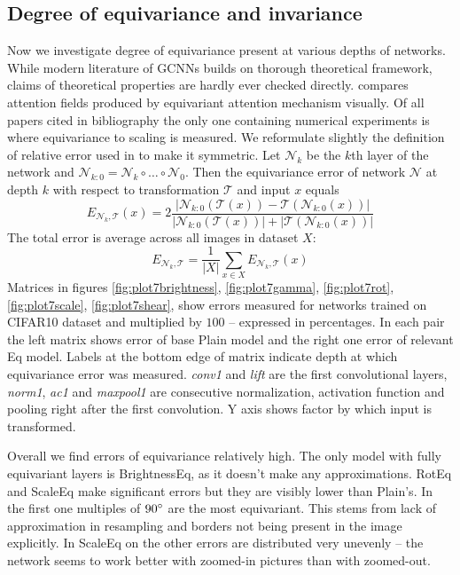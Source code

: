 \subsection{Degree of equivariance and invariance}
    \label{sec:exp_eq}
    \newcommand{\mcn}{\mathcal{N}}
    \newcommand{\mct}{\mathcal{T}}
    Now we investigate degree of equivariance present at
    various depths of networks. While modern literature of GCNNs builds on
    thorough theoretical framework, claims of theoretical properties are hardly
    ever checked directly. \cite{attentive_gcnn} compares attention fields
    produced by equivariant attention mechanism visually.
    Of all papers cited in bibliography the only one containing numerical
    experiments is
    \cite{scale_steerable} where equivariance to scaling is measured.
    We reformulate slightly the definition of relative error used in
    \cite{scale_steerable} to make it symmetric.
    Let $\mcn_k$ be the $k$th layer of
    the network and $\mcn_{k:0} = \mcn_k \circ \dots \circ \mcn_0$. Then the
    equivariance error of network $\mcn$
    at depth $k$ with respect to transformation $\mathcal{T}$
    and input $x$ equals
    $$ E_{\mcn_k,\mct}(x) = 2\frac{\left|\mcn_{k:0}\left(\mct(x)\right) -
    \mct(\mcn_{k:0}(x))\right|}
    {\left|\mcn_{k:0}(\mct(x))\right| + \left|\mct(\mcn_{k:0}(x))\right|} $$
    The total error is average across all images in dataset $X$:
    $$ E_{\mcn_k,\mct} = \frac{1}{|X|}\sum_{x \in X }E_{\mcn_k,\mct}(x) $$
    Matrices in figures
    \ref{fig:plot7brightness},
    \ref{fig:plot7gamma},
    \ref{fig:plot7rot},
    \ref{fig:plot7scale},
    \ref{fig:plot7shear},
    show errors measured for networks trained on CIFAR10 dataset and multiplied
    by $100$ -- expressed in percentages.
    In each pair the left matrix shows error of base Plain model and the right one
    error of relevant Eq model. Labels at the bottom edge of
    matrix indicate depth at which equivariance error was measured.
    \textit{conv1} and \textit{lift} are the first convolutional layers,
    \textit{norm1}, \textit{ac1} and \textit{maxpool1} are consecutive
    normalization, activation function and pooling right after the first
    convolution. Y axis shows factor by which input is transformed.

    Overall we find errors of equivariance relatively high. The only
    model with
    fully equivariant layers is BrightnessEq, as it doesn't make any
    approximations. RotEq and ScaleEq make significant errors but they are
    visibly lower than Plain's. In the first one multiples of $90 \degree$ are
    the most equivariant. This stems from lack of approximation in resampling
    and borders not being present in the image explicitly. In ScaleEq
    on the other errors are distributed very unevenly -- the network seems to
    work better with zoomed-in pictures than with zoomed-out.

